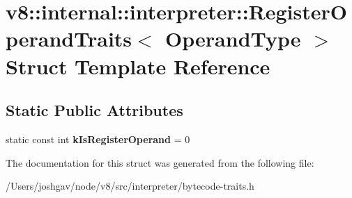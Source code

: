 \hypertarget{structv8_1_1internal_1_1interpreter_1_1_register_operand_traits}{}\section{v8\+:\+:internal\+:\+:interpreter\+:\+:Register\+Operand\+Traits$<$ Operand\+Type $>$ Struct Template Reference}
\label{structv8_1_1internal_1_1interpreter_1_1_register_operand_traits}
\subsection*{Static Public Attributes}
\begin{DoxyCompactItemize}
\item 
static const int {\bfseries k\+Is\+Register\+Operand} = 0\hypertarget{structv8_1_1internal_1_1interpreter_1_1_register_operand_traits_a727ddddc1706acc266b045469312529d}{}\label{structv8_1_1internal_1_1interpreter_1_1_register_operand_traits_a727ddddc1706acc266b045469312529d}

\end{DoxyCompactItemize}


The documentation for this struct was generated from the following file\+:\begin{DoxyCompactItemize}
\item 
/\+Users/joshgav/node/v8/src/interpreter/bytecode-\/traits.\+h\end{DoxyCompactItemize}

